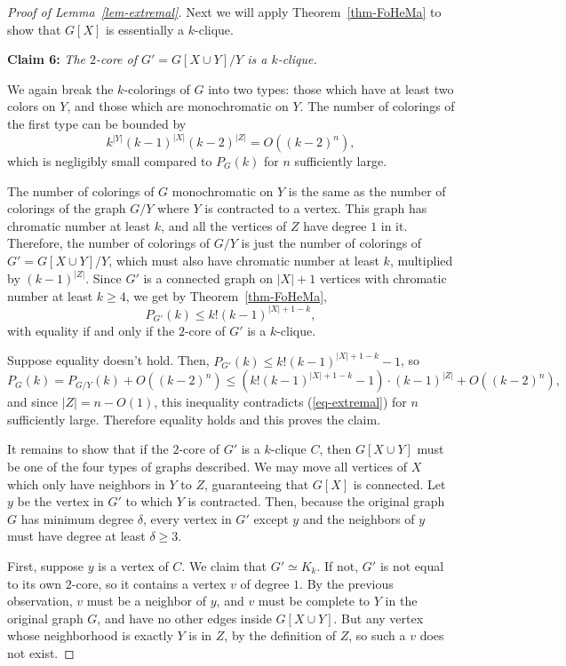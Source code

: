 \documentclass[11pt]{article}
\theoremstyle{plain}
\theoremstyle{definition}
\theoremstyle{remark}
\begin{document}
\begin{proof}[Proof of Lemma~\ref{lem-extremal}]
Next we will apply Theorem~\ref{thm-FoHeMa} to show that $G[X]$ is essentially a $k$-clique.

\bigskip

\noindent \textbf{Claim 6:} {\em The $2$-core of $G'=G[X\cup Y]/Y$ is a $k$-clique.}

We again break the $k$-colorings of $G$ into two types: those which have at least two colors on $Y$, and those which are monochromatic on $Y$. The number of colorings of the first type can be bounded by
\[
k^{|Y|}(k-1)^{|X|} (k-2)^{|Z|} = O((k-2)^{n}),
\]
which is negligibly small compared to $P_G(k)$ for $n$ sufficiently large.

The number of colorings of $G$ monochromatic on $Y$ is the same as the number of colorings of the graph $G/Y$ where $Y$ is contracted to a vertex. This graph has chromatic number at least $k$, and all the vertices of $Z$ have degree $1$ in it. Therefore, the number of colorings of $G/Y$ is just the number of colorings of $G' = G[X\cup Y]/Y$, which must also have chromatic number at least $k$, multiplied by $(k-1)^{|Z|}$. Since $G'$ is a connected graph on $|X| + 1$ vertices with chromatic number at least $k\ge 4$, we get by Theorem~\ref{thm-FoHeMa},
\[
P_{G'}(k)\le k!(k-1)^{|X| + 1 - k},
\]
with equality if and only if the $2$-core of $G'$ is a $k$-clique.

Suppose equality doesn't hold. Then, $P_{G'}(k)\le k!(k-1)^{|X| + 1 - k} -1$, so
\[
P_G(k) = P_{G/Y}(k) + O((k-2)^{n}) \le (k!(k-1)^{|X| + 1 - k} -1) \cdot (k-1)^{|Z|}+O((k-2)^n),
\]
and since $|Z| = n - O(1)$, this inequality contradicts (\ref{eq-extremal}) for $n$ sufficiently large. Therefore equality holds and this proves the claim.

\bigskip

It remains to show that if the $2$-core of $G'$ is a $k$-clique $C$, then $G[X\cup Y]$ must be one of the four types of graphs described. We may move all vertices of $X$ which only have neighbors in $Y$ to $Z$, guaranteeing that $G[X]$ is connected. Let $y$ be the vertex in $G'$ to which $Y$ is contracted. Then, because the original graph $G$ has minimum degree $\delta$, every vertex in $G'$ except $y$ and the neighbors of $y$ must have degree at least $\delta \ge 3$.

First, suppose $y$ is a vertex of $C$. We claim that $G'\simeq K_k$. If not, $G'$ is not equal to its own $2$-core, so it contains a vertex $v$ of degree $1$. By the previous observation, $v$ must be a neighbor of $y$, and $v$ must be complete to $Y$ in the original graph $G$, and have no other edges inside $G[X\cup Y]$. But any vertex whose neighborhood is exactly $Y$ is in $Z$, by the definition of $Z$, so such a $v$ does not exist.


\end{proof}
\end{document}
